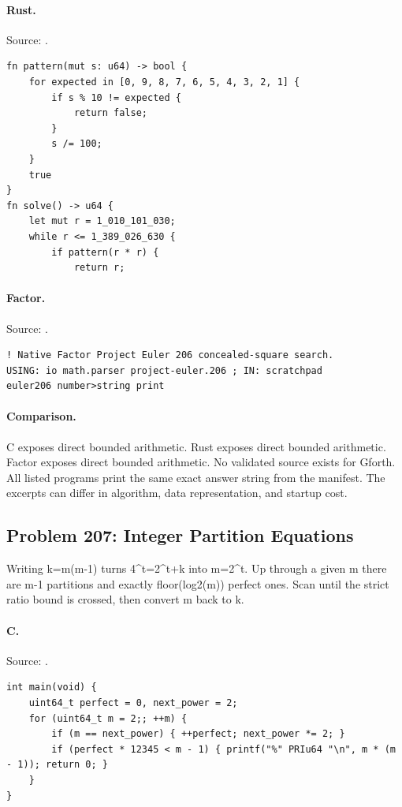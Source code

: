 \paragraph{Rust.} Source: .
\begin{lstlisting}
fn pattern(mut s: u64) -> bool {
    for expected in [0, 9, 8, 7, 6, 5, 4, 3, 2, 1] {
        if s % 10 != expected {
            return false;
        }
        s /= 100;
    }
    true
}
fn solve() -> u64 {
    let mut r = 1_010_101_030;
    while r <= 1_389_026_630 {
        if pattern(r * r) {
            return r;
\end{lstlisting}

\paragraph{Factor.} Source: .
\begin{lstlisting}
! Native Factor Project Euler 206 concealed-square search.
USING: io math.parser project-euler.206 ; IN: scratchpad
euler206 number>string print
\end{lstlisting}

\paragraph{Comparison.}
C exposes direct bounded arithmetic. Rust exposes direct bounded arithmetic. Factor exposes direct bounded arithmetic.
No validated source exists for Gforth.
All listed programs print the same exact answer string from the manifest. The excerpts can differ in algorithm, data representation, and startup cost.

\subsection{Problem 207: Integer Partition Equations}
\label{walkthrough:p207}
Writing k=m(m-1) turns 4\textasciicircum{}t=2\textasciicircum{}t+k into m=2\textasciicircum{}t. Up through a given m there are m-1 partitions and exactly floor(log2(m)) perfect ones. Scan until the strict ratio bound is crossed, then convert m back to k.

\paragraph{C.} Source: .
\begin{lstlisting}
int main(void) {
    uint64_t perfect = 0, next_power = 2;
    for (uint64_t m = 2;; ++m) {
        if (m == next_power) { ++perfect; next_power *= 2; }
        if (perfect * 12345 < m - 1) { printf("%" PRIu64 "\n", m * (m - 1)); return 0; }
    }
}
\end{lstlisting}

